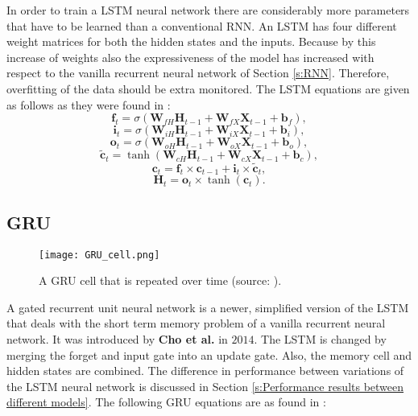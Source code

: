 In order to train a LSTM neural network there are considerably more parameters that have to be learned than a conventional RNN. An LSTM has four different weight matrices for both the hidden states and the inputs. Because by this increase of weights also the expressiveness of the model has increased with respect to the vanilla recurrent neural network of Section \ref{s:RNN}. Therefore, overfitting of the data should be extra monitored. The LSTM equations are given as follows as they were found in \cite{Teuwen2019}:
\begin{equation}\label{LSTM_forget}
	\textbf{f}_{t} = \sigma(\textbf{W}_{fH}\textbf{H}_{t-1}+\textbf{W}_{fX}\textbf{X}_{t-1}+\textbf{b}_{f}),
\end{equation}
\begin{equation}\label{LSTM_input}
	\textbf{i}_{t} = \sigma(\textbf{W}_{iH}\textbf{H}_{t-1}+\textbf{W}_{iX}\textbf{X}_{t-1}+\textbf{b}_{i}),
\end{equation}
\begin{equation}\label{LSTM_output}
	\textbf{o}_{t} = \sigma(\textbf{W}_{oH}\textbf{H}_{t-1}+\textbf{W}_{oX}\textbf{X}_{t-1}+\textbf{b}_{o}),
\end{equation}
\begin{equation}\label{LSTM_rnn}
	\tilde{\textbf{c}}_{t} = \tanh(\textbf{W}_{cH}\textbf{H}_{t-1}+\textbf{W}_{cX}\textbf{X}_{t-1}+\textbf{b}_{c}),
\end{equation}
\begin{equation}\label{LSTM_memory}
	\textbf{c}_t = \textbf{f}_t\times\textbf{c}_{t-1}+\textbf{i}_t\times\tilde{\textbf{c}}_t,
\end{equation}
\begin{equation}\label{LSTM_next}
	\textbf{H}_t = \textbf{o}_t\times\tanh(\textbf{c}_t).
\end{equation}



\subsection{GRU}\label{s:GRU}

\begin{figure}[ht]
	\centering
	\texttt{[image: GRU\_cell.png]}
	\caption{A GRU cell that is repeated over time (source: \cite{Olah}).}
	\label{fig:GRU_cell}
\end{figure}
A gated recurrent unit neural network is a newer, simplified version of the LSTM that deals with the short term memory problem of a vanilla recurrent neural network. It was introduced by \textbf{Cho et al.} in $ 2014 $. The LSTM is changed by merging the forget and input gate into an update gate. Also, the memory cell and hidden states are combined. The difference in performance between variations of the LSTM neural network is discussed in Section \ref{s:Performance results between different models}. The following GRU equations are as found in \cite{Teuwen2019}:

